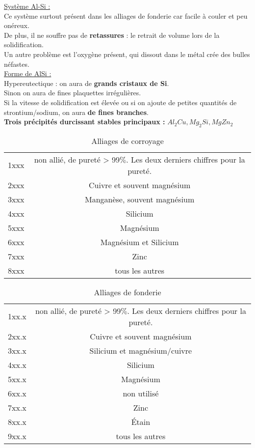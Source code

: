 \documentclass[../main.tex]{subfiles}
\begin{document}
\quad \underline{Système Al-Si :}\\
Ce système surtout présent dans les alliages de fonderie car facile à couler et peu onéreux.\\
De plus, il ne souffre pas de \textbf{retassures} : le retrait de volume lors de la solidification.\\
Un autre problème est l'oxygène présent, qui dissout dans le métal crée des bulles néfastes.\\

\quad \underline{Forme de AlSi :}\\
Hypereutectique : on aura de \textbf{grands cristaux de Si}. \\
Sinon on aura de fines plaquettes irrégulières.\\
Si la vitesse de solidification est élevée ou si on ajoute de petites quantités de strontium/sodium, on aura \textbf{de fines branches}.\\

\textbf{Trois précipités durcissant stables principaux :} $Al_2Cu, Mg_2Si, MgZn_2$\\

\begin{table}[hbt!]
    \centering
    \begin{tabular}{||c|c|}
    \hline
        1xxx & non allié, de pureté > 99$\%$. Les deux derniers chiffres pour la pureté. \\
        2xxx & Cuivre et souvent magnésium\\
        3xxx & Manganèse, souvent magnésium\\
        4xxx & Silicium\\
        5xxx & Magnésium\\
        6xxx & Magnésium et Silicium\\
        7xxx & Zinc\\
        8xxx & tous les autres\\
        \hline
    \end{tabular}
    \caption{Alliages de corroyage}
     
\end{table}


\begin{table}[hbt!]
    \centering
    \begin{tabular}{||c|c|}
    \hline
        1xx.x & non allié, de pureté > 99$\%$. Les deux derniers chiffres pour la pureté. \\
        2xx.x & Cuivre et souvent magnésium\\
        3xx.x & Silicium et magnésium/cuivre\\
        4xx.x & Silicium\\
        5xx.x & Magnésium\\
        6xx.x & non utilisé\\
        7xx.x & Zinc\\
        8xx.x & Étain\\
        9xx.x & tous les autres\\
        \hline
    \end{tabular}
    \caption{Alliages de fonderie}
     
\end{table}
\end{document}
